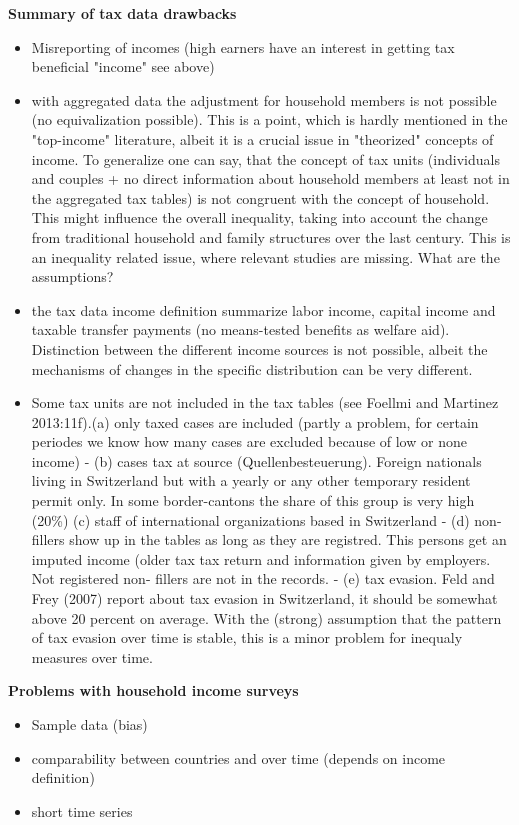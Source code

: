 \documentclass[twoside]{article}\usepackage[]{graphicx}\usepackage[]{color}
\begin{document}
\begin{multicols}{2}
\textbf{Summary of tax data drawbacks}
\begin{itemize}
\item Misreporting of incomes (high earners have an interest in getting tax beneficial "income" see above)
\item with aggregated data the adjustment for household members is not possible (no equivalization possible). This is a point, which is hardly mentioned in the "top-income" literature, albeit it is a crucial issue in "theorized" concepts of income. To generalize one can say, that the concept of tax units (individuals and couples + no direct information about household members at least not in the aggregated tax tables) is not congruent with the concept of household. This might influence the overall inequality, taking into account the change from traditional household and family structures over the last century. This is an inequality related issue, where relevant studies are missing. What are the assumptions?
\item the tax data income definition summarize labor income, capital income and taxable transfer payments (no means-tested benefits as welfare aid). Distinction between the different income sources is not possible, albeit the mechanisms of changes in the specific distribution can be very different.
\item Some tax units are not included in the tax tables (see Foellmi and Martinez 2013:11f).(a) only taxed cases are included (partly a problem, for certain periodes we know how many cases are excluded because of low or none income)	- (b) cases tax at source (Quellenbesteuerung). Foreign nationals living in Switzerland but with a yearly or any other temporary resident permit only. In some border-cantons the share of this group is very high (20\%) 
(c) staff of international organizations based in Switzerland	- (d) non-fillers show up in the tables as long as they are registred. This persons get an imputed income (older tax tax return and information given by employers. Not registered non-	fillers are not in the records.
- (e) tax evasion. Feld and Frey (2007) report about tax evasion in Switzerland, it should be somewhat above 20 percent on average. With the (strong) assumption that the pattern of tax evasion over time is stable, this is a minor problem for inequaly measures over time.
\end{itemize}

\textbf{Problems with household income surveys}
\begin{itemize}
\item Sample data (bias)
\item comparability between countries and over time (depends on income definition)
\item short time series
\end{itemize}


\end{multicols}
\end{document}
